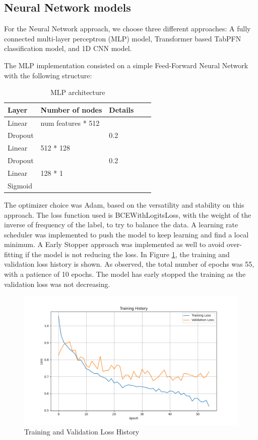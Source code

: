 \documentclass[10pt,letterpaper]{article}
\begin{document}
\subsection{Neural Network models}

For the Neural Network approach, we choose three different approaches: A fully connected multi-layer perceptron (MLP) model, Transformer based TabPFN classification model, and 1D CNN model. 

The MLP implementation consisted on a simple Feed-Forward Neural Network with the following structure:

\begin{table}[H]
\centering
\footnotesize
\begin{tabular}{lllll}
\toprule
\textbf{Layer} & \textbf{Number of nodes} & \textbf{Details} \\
\midrule
Linear & num features * 512 & \\
Dropout &  & 0.2 \\
Linear& 512 * 128 & \\
Dropout & & 0.2 \\
Linear & 128 * 1 & \\
Sigmoid & & \\
\bottomrule
\end{tabular}
\caption{MLP architecture}
\end{table}

The optimizer choice was Adam, based on the versatility and stability on this approach. 
The loss function used is BCEWithLogitsLoss, with the weight of the inverse of frequency of the 
label, to try to balance the data. A learning rate scheduler was implemented to push the model to 
keep learning and find a local minimum. A Early Stopper approach was implemented as well to avoid 
over-fitting if the model is not reducing the loss. In Figure \ref{fig:nn-loss}, the training and
validation loss history is shown. As observed, the total number of epochs was 55, with a patience of 10 epochs.
The model has early stopped the training as the validation loss was not decreasing.

\begin{figure}[H]
    \centering
    \includegraphics[width=0.5\linewidth]{../plots/NN_loss_graph.png}
    \caption{Training and Validation Loss History}
    \label{fig:nn-loss}
\end{figure}
\end{document}

